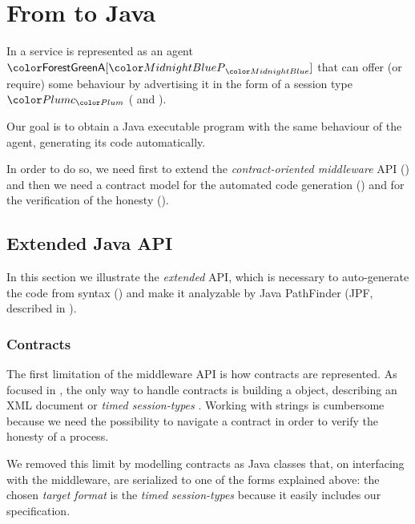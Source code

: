 \chapter{From \coco to Java}\label{chap:co2-to-java}

In \coco a service is represented as an agent $\sys{\pmv{A}}{\procP}$ that can offer (or require) some behaviour by advertising it in the form of a session type $\contrP$ ( and ).

Our goal is to obtain a Java executable program with the same behaviour of the \coco agent, generating its code automatically.

In order to do so, we need first to extend the \textit{contract-oriented middleware} API () and then we need a contract model for the automated code generation () and for the verification of the honesty ().



\section{Extended \coco Java API}\label{sec:extended-api}
In this section we illustrate the \textit{extended} API, which is necessary to auto-generate the code from \coco syntax () and make it analyzable by Java PathFinder (JPF, described in ).


\subsection{Contracts}\label{sec:java-contracts-model}
The first limitation of the middleware API is how contracts are represented. As focused in , the only way to handle contracts is building a  object, describing an XML document or \textit{timed session-types} \cite{Bartoletti15forte}. Working with strings is cumbersome because we need the possibility to navigate a contract in order to verify the honesty of a process.

We removed this limit by modelling contracts as Java classes that, on interfacing with the middleware, are serialized to one of the forms explained above: the chosen \textit{target format} is  the \textit{timed session-types} because it easily includes our specification.


